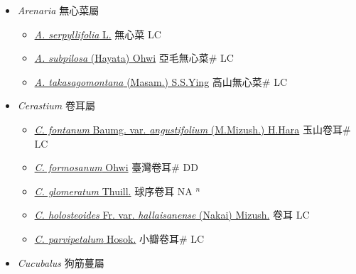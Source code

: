 
  \begin{itemize}
 \item[] \textit{Arenaria} 無心菜屬
                    
  \begin{itemize}
        \item[] \href{http://www.theplantlist.org/tpl1.1/search?q=Arenaria+serpyllifolia}{\textit{A. serpyllifolia} L.}   無心菜 LC
        \item[] \href{http://www.theplantlist.org/tpl1.1/search?q=Arenaria+subpilosa}{\textit{A. subpilosa} (Hayata) Ohwi}   亞毛無心菜\# LC
        \item[] \href{http://www.theplantlist.org/tpl1.1/search?q=Arenaria+takasagomontana}{\textit{A. takasagomontana} (Masam.) S.S.Ying}   高山無心菜\# LC
  \end{itemize}
 \item[] \textit{Cerastium} 卷耳屬
                    
  \begin{itemize}
        \item[] \href{http://www.theplantlist.org/tpl1.1/search?q=Cerastium+fontanum+var.+angustifolium}{\textit{C. fontanum} Baumg. var. \textit{angustifolium} (M.Mizush.) H.Hara}   玉山卷耳\# LC
        \item[] \href{http://www.theplantlist.org/tpl1.1/search?q=Cerastium+formosanum}{\textit{C. formosanum} Ohwi}   臺灣卷耳\# DD
        \item[] \href{http://www.theplantlist.org/tpl1.1/search?q=Cerastium+glomeratum}{\textit{C. glomeratum} Thuill.}   球序卷耳 NA $^n$
        \item[] \href{http://www.theplantlist.org/tpl1.1/search?q=Cerastium+holosteoides+var.+hallaisanense}{\textit{C. holosteoides} Fr. var. \textit{hallaisanense} (Nakai) Mizush.}   卷耳 LC
        \item[] \href{http://www.theplantlist.org/tpl1.1/search?q=Cerastium+parvipetalum}{\textit{C. parvipetalum} Hosok.}   小瓣卷耳\# LC
  \end{itemize}
 \item[] \textit{Cucubalus} 狗筋蔓屬
                    

\end{itemize}
